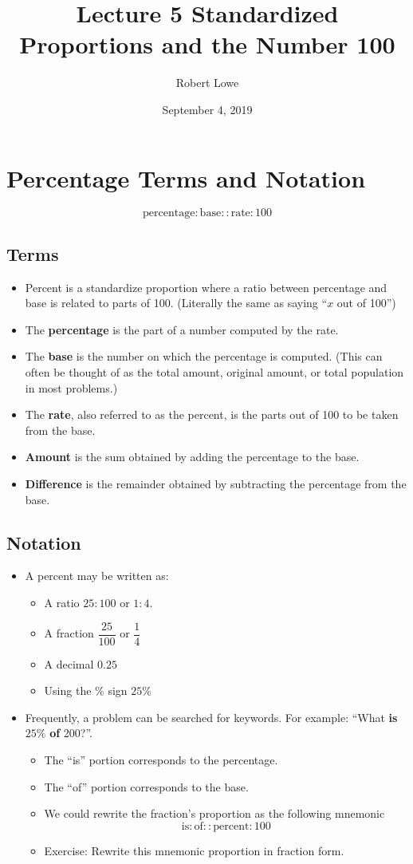 \documentclass{article}
\title{Lecture 5  Standardized Proportions and the Number 100}
\author{Robert Lowe}
\date{September 4, 2019}
\begin{document}
\maketitle

\section*{Percentage Terms and Notation}
\[
\mathrm{percentage} : \mathrm{base} :: \mathrm{rate} : 100
\]
\subsection*{Terms}
\begin{itemize}
    \item Percent is a standardize proportion where a ratio between percentage and base is related to parts of 100. (Literally the same as saying ``$x$ out of 100'')
    \item The {\bf percentage} is the part of a number computed by the rate.
    \item The {\bf base} is the number on which the percentage is computed.  (This can often be thought of as the total amount, original amount, or total population in most problems.)
    \item The {\bf rate}, also referred to as the percent, is the parts out of 100 to be taken from the base. 
    \item {\bf Amount} is the sum obtained by adding the percentage to the base.
    \item {\bf Difference} is the remainder obtained by subtracting the percentage from the base.
\end{itemize}


\subsection*{Notation}
\begin{itemize}
\item A percent may be written as:
\begin{itemize}
  \item A ratio $25 : 100$ or $1:4$.
  \item A fraction $\dfrac{25}{100}$ or $\dfrac{1}{4}$
  \item A decimal $0.25$
  \item Using the $\%$ sign $25\%$
\end{itemize}
\item Frequently, a problem can be searched for keywords.  For example: ``What {\bf is} $25\%$ {\bf of} 200?''.
\begin{itemize}
  \item The ``is'' portion corresponds to the percentage.
  \item The ``of'' portion corresponds to the base.
  \item We could rewrite the fraction's proportion as the following mnemonic
  \[
  \mathrm{is} : \mathrm{of} :: \mathrm{percent} : 100
  \]
  \item Exercise: Rewrite this mnemonic proportion in fraction form.
\end{itemize}
\end{itemize}
\end{document}
